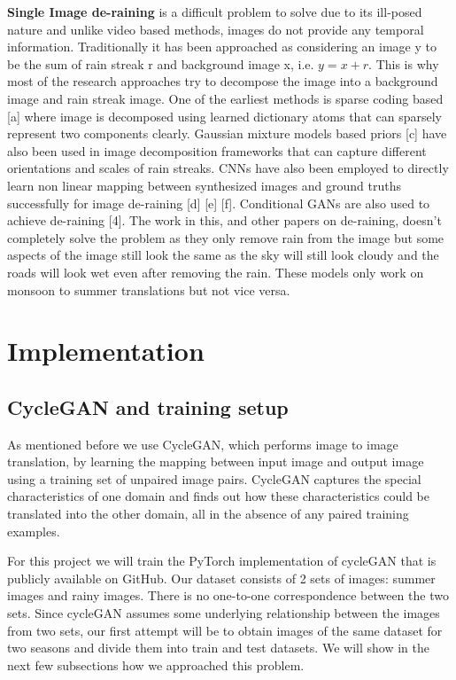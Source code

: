 \documentclass{article}
\begin{document}
\textbf{Single Image de-raining} is a difficult problem to solve due to its ill-posed nature and unlike video based methods, images do not provide any temporal information. Traditionally it has been approached as considering an image y to be the sum of rain streak r and background image x, i.e. $y = x + r$. This is why most of the research approaches try to decompose the image into a background image and rain streak image. One of the earliest methods is sparse coding based [a] where image is decomposed using learned dictionary atoms that can sparsely represent two components clearly. Gaussian mixture models based priors [c] have also been used in image decomposition frameworks that can capture different orientations and scales of rain streaks. CNNs have also been employed to directly learn non linear mapping between synthesized images and ground truths successfully for image de-raining [d] [e] [f]. Conditional GANs are also used to achieve de-raining [4]. The work in this, and other papers on de-raining, doesn’t completely solve the problem as they only remove rain from the image but some aspects of the image still look the same as the sky will still look cloudy and the roads will look wet even after removing the rain. These models only work on monsoon to summer translations but not vice versa.

\section{Implementation}
\label{implementation}

\subsection{CycleGAN and training setup}

As mentioned before we use CycleGAN, which performs image to image  translation, by learning the mapping between input image and output image using a training set of unpaired image pairs. CycleGAN captures the special characteristics of one domain and finds out how these characteristics could be translated into the other domain, all in the absence of any paired training examples.

For this project we will train the PyTorch implementation of cycleGAN that is publicly available on GitHub. Our dataset consists of 2 sets of images: summer images and rainy images. There is no one-to-one correspondence between the two sets. Since cycleGAN assumes some underlying relationship between the images from two sets, our first attempt will be to obtain images of the same dataset for two seasons and divide them into train and test datasets. We will show in the next few subsections how we approached this problem.
\end{document}
